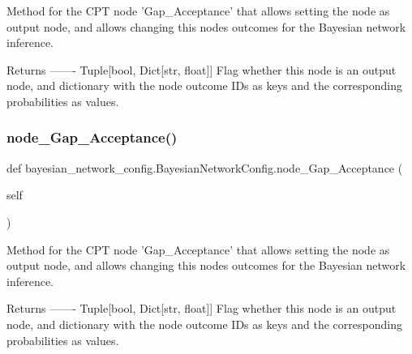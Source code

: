 \begin{DoxyVerb}Method for the CPT node 'Gap_Acceptance' that allows setting the node as output node,
and allows changing this nodes outcomes for the Bayesian network inference.

Returns
-------
Tuple[bool, Dict[str, float]]
    Flag whether this node is an output node, and dictionary with the node outcome IDs as keys
    and the corresponding probabilities as values.
\end{DoxyVerb}
 \mbox{\label{classbayesian__network__config_1_1_bayesian_network_config_a86c960e95351259be8f751f98ac91aa5}} 
\subsubsection{\texorpdfstring{node\+\_\+\+Gap\+\_\+\+Acceptance()}{node\_Gap\_Acceptance()}\hspace{0.1cm}{\footnotesize\ttfamily [2/2]}}
{\footnotesize\ttfamily def bayesian\+\_\+network\+\_\+config.\+Bayesian\+Network\+Config.\+node\+\_\+\+Gap\+\_\+\+Acceptance (\begin{DoxyParamCaption}\item[{}]{self }\end{DoxyParamCaption})}

\begin{DoxyVerb}Method for the CPT node 'Gap_Acceptance' that allows setting the node as output node, 
and allows changing this nodes outcomes for the Bayesian network inference.

Returns
-------
Tuple[bool, Dict[str, float]]
    Flag whether this node is an output node, and dictionary with the node outcome IDs as keys 
    and the corresponding probabilities as values.
\end{DoxyVerb}
 \mbox{\label{classbayesian__network__config_1_1_bayesian_network_config_a86c973a53f1f78567b32ffa68cea467a}} 
